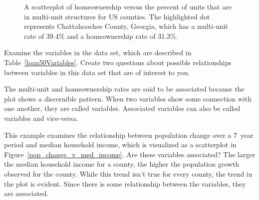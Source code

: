 \begin{figure}
  \centering
  \caption{A scatterplot of homeownership versus the percent
      of units that are in multi-unit structures for US counties.
      The highlighted dot represents Chattahoochee County, Georgia,
      which has a multi-unit rate of 39.4\% and a homeownership rate
      of 31.3\%.}
  \label{multiunitsVsOwnership}
\end{figure}

\begin{exercisewrap}
\begin{nexercise}
Examine the variables in the  data set,
which are described in Table~\vref{loan50Variables}.
Create two questions about possible relationships
between variables in this data set that are of interest
to you.\footnotemark
\end{nexercise}
\end{exercisewrap}

The multi-unit and homeownership rates are said to be
associated because the plot shows a discernible pattern.
When two variables show some connection with one another,
they are called  variables.
Associated variables can also be called 
variables and vice-versa.

\begin{examplewrap}
\begin{nexample}{This example examines the relationship
    between population change over a 7~year period and
    median household income,
    which is visualized as a scatterplot in
    Figure~\ref{pop_change_v_med_income}.
    Are these variables associated?}
  The larger the median household income for a county,
  the higher the population growth observed for the county.
  While this trend isn't true for every county,
  the trend in the plot is evident.
  Since there is some relationship between the variables,
  they are associated.
\end{nexample}
\end{examplewrap}


